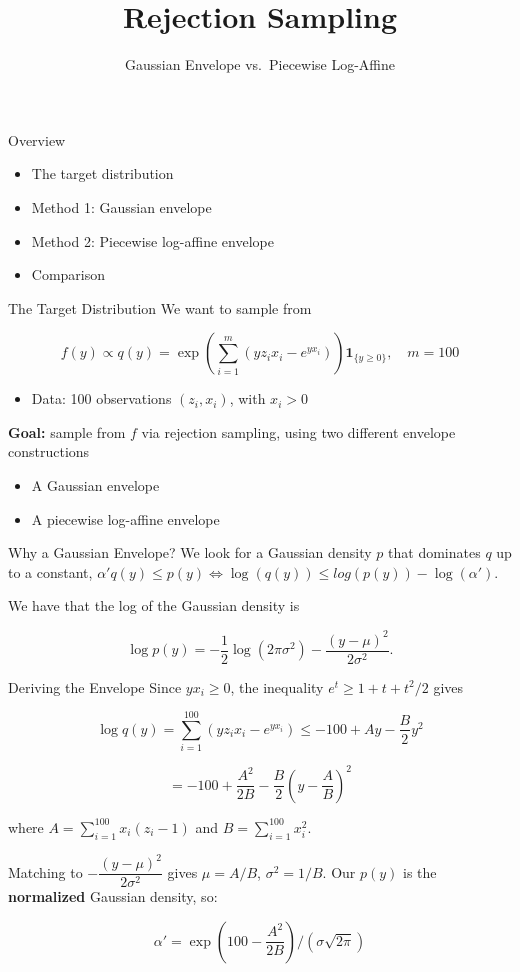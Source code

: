 \documentclass[
  ignorenonframetext,
]{beamer}
\title{\texorpdfstring{Rejection Sampling}{Rejection Sampling}}
\subtitle{\texorpdfstring{Gaussian Envelope vs.~Piecewise
Log-Affine}{Gaussian Envelope vs.~Piecewise Log-Affine}}
\author{}
\date{}
\providecommand{\tightlist}{%
  \setlength{\itemsep}{0pt}\setlength{\parskip}{0pt}}
\begin{document}
\frame{\titlepage}


\begin{frame}{Overview}
\protect{}\label{overview}
\begin{itemize}
\item
  The target distribution
\item
  Method 1: Gaussian envelope
\item
  Method 2: Piecewise log-affine envelope
\item
  Comparison
\end{itemize}
\end{frame}

\begin{frame}{The Target Distribution}
\protect{}\label{the-target-distribution}
We want to sample from

\[
f(y) \propto q(y) = \exp\left(\sum_{i=1}^{m} (y z_i x_i - e^{y x_i})\right) \mathbf{1}_{\{y \geq 0\}}, \quad m = 100
\]

\begin{itemize}
\tightlist
\item
  Data: 100 observations \((z_i, x_i)\), with \(x_i > 0\)
\end{itemize}

\textbf{Goal:} sample from \(f\) via rejection sampling, using two
different envelope constructions

\begin{itemize}
\tightlist
\item
  A Gaussian envelope
\item
  A piecewise log-affine envelope
\end{itemize}
\end{frame}

\begin{frame}{Why a Gaussian Envelope?}
\protect{}\label{why-a-gaussian-envelope}
We look for a Gaussian density \(p\) that dominates \(q\) up to a
constant,
\(\alpha' q(y) \leq p(y) \Leftrightarrow \log(q(y))\leq log(p(y)) - \log(\alpha')\).

We have that the log of the Gaussian density is

\[
\log p(y) = -\frac{1}{2}\log(2\pi\sigma^2) - \frac{(y-\mu)^2}{2\sigma^2}.
\]
\end{frame}

\begin{frame}{Deriving the Envelope}
\protect{}\label{deriving-the-envelope}
Since \(yx_i \geq 0\), the inequality \(e^t \geq 1 + t + t^2/2\) gives

\[
\log q(y) = \sum_{i=1}^{100}(yz_ix_i-e^{yx_i}) \leq -100 + Ay - \frac{B}{2}y^2
\]

\[
= -100 + \frac{A^2}{2B} - \frac{B}{2}\left(y - \frac{A}{B}\right)^2
\]

where \(A = \sum^{100}_{i=1} x_i(z_i - 1)\) and
\(B = \sum_{i=1}^{100} x_i^2\).

Matching to \(-\dfrac{(y-\mu)^2}{2\sigma^2}\) gives \(\mu = A/B\),
\(\sigma^2 = 1/B\). Our \(p(y)\) is the \textbf{normalized} Gaussian
density, so:

\[
\boxed{\alpha' = \exp\left(100 - \frac{A^2}{2B}\right) \Big/ \left(\sigma\sqrt{2\pi}\right)}
\]
\end{frame}
\end{document}
